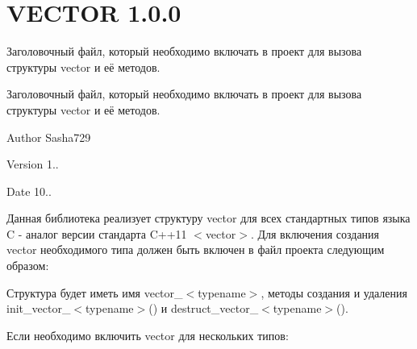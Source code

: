 \chapter{VECTOR 1.0.0}
\hypertarget{index}{}\label{index}
Заголовочный файл, который необходимо включать в проект для вызова структуры vector и её методов.

Заголовочный файл, который необходимо включать в проект для вызова структуры vector и её методов.   

\begin{DoxyAuthor}{Author}
Sasha729 
\end{DoxyAuthor}
\begin{DoxyVersion}{Version}
1.. 
\end{DoxyVersion}
\begin{DoxyDate}{Date}
10..
\end{DoxyDate}
Данная библиотека реализует структуру vector для всех стандартных типов языка C -\/ аналог версии стандарта C++11 $<$vector$>$. Для включения создания vector необходимого типа  должен быть включен в файл проекта следующим образом\+: 
\begin{DoxyCode}{0}
\DoxyCodeLine{\textcolor{preprocessor}{\#define\ <TYPENAME>\_VECTOR}}

\end{DoxyCode}


Структура будет иметь имя vector\+\_\+$<$typename$>$, методы создания и удаления init\+\_\+vector\+\_\+$<$typename$>$() и destruct\+\_\+vector\+\_\+$<$typename$>$().

Если необходимо включить vector для нескольких типов\+: 
\begin{DoxyCode}{0}
\DoxyCodeLine{\textcolor{preprocessor}{\#define\ <TYPENAME\_1>\_VECTOR}}
\DoxyCodeLine{\textcolor{preprocessor}{\#define\ <TYPENAME\_2>\_VECTOR}}
\DoxyCodeLine{}

\end{DoxyCode}


